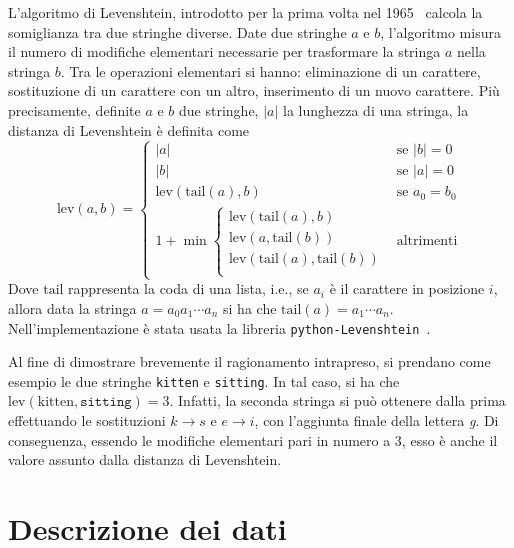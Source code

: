 L'algoritmo di Levenshtein, introdotto per la prima volta nel
1965~\cite{levenshtein1966} calcola la somiglianza tra due stringhe diverse.
Date due stringhe $a$ e $b$, l'algoritmo misura il numero di modifiche
elementari necessarie per trasformare la stringa $a$ nella stringa $b$.
Tra le operazioni elementari si hanno: eliminazione di un carattere,
sostituzione di un carattere con un altro, inserimento di un nuovo carattere.
Più precisamente, definite $a$ e $b$ due stringhe, $|a|$ la lunghezza di una
stringa, la distanza di Levenshtein è definita come
\begin{equation*}
  \text{lev}(a, b) =
  \begin{cases}
    |a| & \text{se } |b| = 0 \\
    |b| & \text{se } |a| = 0 \\
    \text{lev}(\text{tail}(a), b) & \text{se } a_0 = b_0 \\
    1 + \min\begin{cases}
      \text{lev}(\text{tail}(a), b) \\
      \text{lev}(a, \text{tail}(b)) \\
      \text{lev}(\text{tail}(a), \text{tail}(b)) \\
    \end{cases}
    & \text{altrimenti}
  \end{cases}
\end{equation*}
%
Dove $\text{tail}$ rappresenta la coda di una lista, i.e., se $a_i$ è il
carattere in posizione $i$, allora data la stringa $a = a_0a_1\cdots a_n$ si ha
che $\text{tail}(a) = a_1\cdots a_n$.
Nell'implementazione è stata usata la libreria
\texttt{python-Levenshtein}~\cite{pythonLevenshtein}.

Al fine di dimostrare brevemente il ragionamento intrapreso, si prendano come
esempio le due stringhe \texttt{kitten} e \texttt{sitting}. In tal caso, si
ha che $\text{lev}(\text{kitten}, \texttt{sitting}) = 3$. Infatti, la seconda
stringa si può ottenere dalla prima effettuando le sostituzioni $k \to s$
e $e \to i$, con l'aggiunta finale della lettera \textit{g}.
Di conseguenza, essendo le modifiche elementari pari in numero a 3, esso è
anche il valore assunto dalla distanza di Levenshtein.

\section{Descrizione dei dati}\label{sec:descrizionedati}

